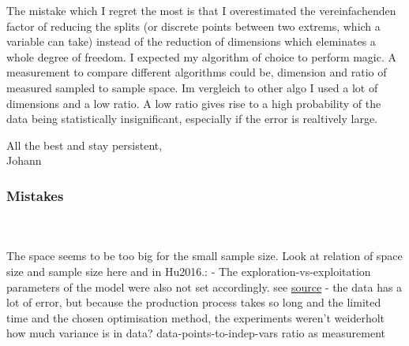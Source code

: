 The mistake which I regret the most is that I overestimated the vereinfachenden factor of reducing the splits (or discrete points between two extrems, which a variable can take) instead of the reduction of dimensions which eleminates a whole degree of freedom. 
I expected my algorithm of choice to perform magic. 
A measurement to compare different algorithms could be, dimension and ratio of measured sampled to sample space. 
Im vergleich to other algo I used a lot of dimensions and a low ratio.
A low ratio gives rise to a high probability of the data being statistically insignificant, especially if the error is realtively large. 

All the best and stay persistent, \\  
Johann \\


\subsubsection{Mistakes} 
\\
\\
The space seems to be too big for the small sample size.
Look at relation of space size and sample size here and in Hu2016.:
%
- The exploration-vs-exploitation parameters of the model were also not set accordingly.
see \href{https://search.r-project.org/CRAN/refmans/emma/html/emma.html}{source}
%
- the data has a lot of error, but because the production process takes so long and the 
limited time and the chosen optimisation method, the experiments weren't weiderholt
how much variance is in data? 
%
data-points-to-indep-vars ratio as measurement
